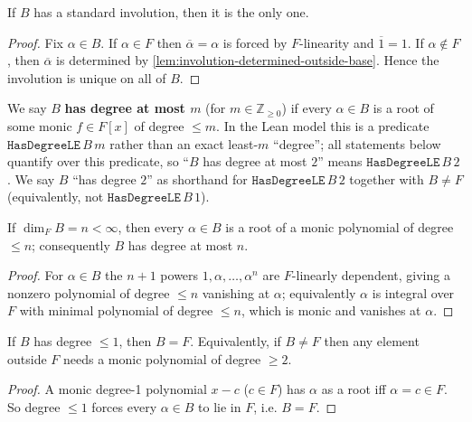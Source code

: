 \begin{corollary}
    \label{cor:involution-unique}
    If $B$ has a standard involution, then it is the only one.
\end{corollary}
\begin{proof}
    Fix $\alpha \in B$. If $\alpha \in F$ then $\overline\alpha = \alpha$ is forced
    by $F$-linearity and $\overline 1 = 1$. If $\alpha \notin F$, then
    $\overline\alpha$ is determined by
    \ref{lem:involution-determined-outside-base}. Hence the involution is unique on
    all of $B$.
\end{proof}

\begin{definition}
    \label{def:degree}
    We say $B$ \textbf{has degree at most $m$} (for $m \in \mathbb{Z}_{\geq 0}$) if
    every $\alpha \in B$ is a root of some monic $f \in F[x]$ of degree $\leq m$.
    In the Lean model this is a predicate $\mathtt{HasDegreeLE}\,B\,m$ rather than an
    exact least-$m$ ``degree''; all statements below quantify over this predicate,
    so ``$B$ has degree at most $2$'' means $\mathtt{HasDegreeLE}\,B\,2$. We say $B$
    ``has degree $2$'' as shorthand for $\mathtt{HasDegreeLE}\,B\,2$ together with
    $B \neq F$ (equivalently, not $\mathtt{HasDegreeLE}\,B\,1$).
\end{definition}

\begin{lemma}
    \label{lem:findim-degree}
    If $\dim_F B = n < \infty$, then every $\alpha \in B$ is a root of a monic
    polynomial of degree $\leq n$; consequently $B$ has degree at most $n$.
\end{lemma}
\begin{proof}
    For $\alpha \in B$ the $n+1$ powers $1, \alpha, \dots, \alpha^n$ are
    $F$-linearly dependent, giving a nonzero polynomial of degree $\leq n$
    vanishing at $\alpha$; equivalently $\alpha$ is integral over $F$ with minimal
    polynomial of degree $\leq n$, which is monic and vanishes at $\alpha$.
\end{proof}

\begin{lemma}
    \label{lem:degree-one-eq-base}
    If $B$ has degree $\leq 1$, then $B = F$. Equivalently, if $B \neq F$ then any
    element outside $F$ needs a monic polynomial of degree $\geq 2$.
\end{lemma}
\begin{proof}
    A monic degree-1 polynomial $x - c$ ($c \in F$) has $\alpha$ as a root iff
    $\alpha = c \in F$. So degree $\leq 1$ forces every $\alpha \in B$ to lie in
    $F$, i.e. $B = F$.
\end{proof}

